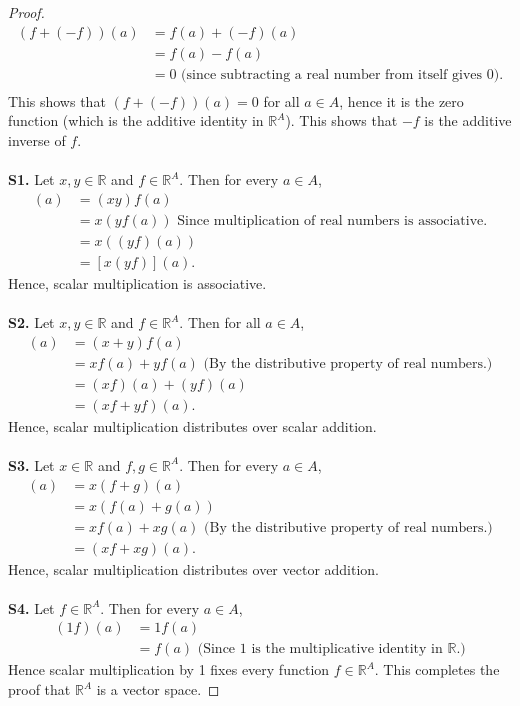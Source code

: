 \documentclass[12pt,letterpaper,reqno]{article}
\numberwithin{equation}{section}
\begin{document}
\begin{proof}
\begin{align*}
	(f+(-f))(a)&=f(a)+(-f)(a) \\
	&=f(a)-f(a) \\
	&=0 \text{ (since subtracting a real number from itself gives 0).}\\
\end{align*}
This shows that $(f+(-f))(a)=0$ for all $a \in A$, hence it is the zero function (which is the additive identity in $\mathbb{R}^A$). This shows that $-f$ is the additive inverse of $f$. \\
\\
{\bf S1.} Let $x,y \in \mathbb{R}$ and $f \in \mathbb{R}^A$. Then for every $a \in A$, 
\begin{align*}
	[(xy)f](a)&=(xy)f(a) \\
	&=x(yf(a)) \text{ Since multiplication of real numbers is associative.} \\
	&=x((yf)(a)) \\
	&=[x(yf)](a).
\end{align*}
Hence, scalar multiplication is associative. \\
\\
{\bf S2.} Let $x,y \in \mathbb{R}$ and $f \in \mathbb{R}^A$. Then for all $a \in A$,
\begin{align*}
	[(x+y)f](a)&=(x+y)f(a) \\
	&=xf(a)+yf(a) \text{ (By the distributive property of real numbers.)}\\
	&=(xf)(a)+(yf)(a) \\
	&=(xf+yf)(a).
\end{align*}
Hence, scalar multiplication distributes over scalar addition. \\
\\
{\bf S3.} Let $x \in \mathbb{R}$ and $f,g \in \mathbb{R}^A$. Then for every $a \in A$,
\begin{align*}
	[x(f+g)](a)&=x(f+g)(a) \\
	&=x(f(a)+g(a)) \\
	&=xf(a)+xg(a) \text{ (By the distributive property of real numbers.)}\\
	&=(xf+xg)(a).
\end{align*}
Hence, scalar multiplication distributes over vector addition. \\
\\
{\bf S4.} Let $f \in \mathbb{R}^A$. Then for every $a \in A$,
\begin{align*}
	(1f)(a)&=1f(a) \\
	&=f(a) \text{ (Since 1 is the multiplicative identity in $\mathbb{R}$.)}
\end{align*}
Hence scalar multiplication by 1 fixes every function $f \in \mathbb{R}^A$. This completes the proof that $\mathbb{R}^A$ is a vector space.
\end{proof}
\end{document}
